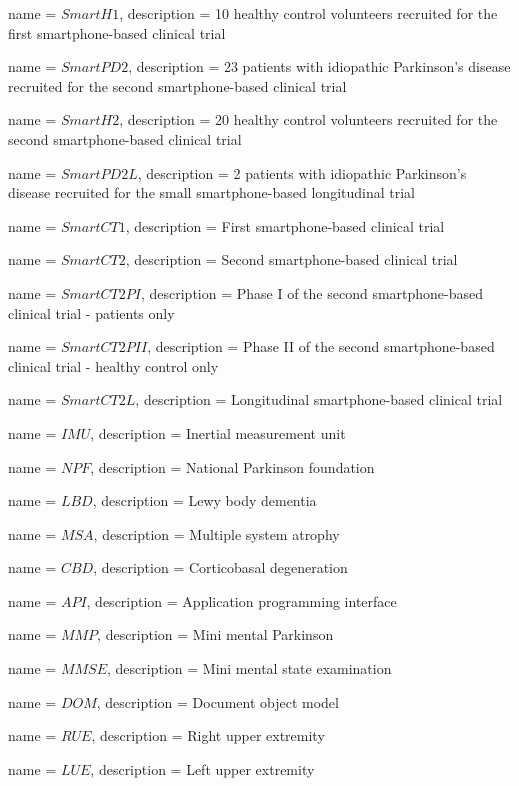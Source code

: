 {
	name = $SmartH1$, 
	description = 10 healthy control volunteers recruited for the first smartphone-based clinical trial
}

{
	name = $SmartPD2$, 
	description = 23 patients with idiopathic Parkinson's disease recruited for the second smartphone-based clinical trial
}

{
	name = $SmartH2$, 
	description = 20 healthy control volunteers recruited for the second smartphone-based clinical trial
}

{
	name = $SmartPD2L$, 
	description = 2 patients with idiopathic Parkinson's disease recruited for the small smartphone-based longitudinal trial
}

{
	name = $SmartCT1$, 
	description = First smartphone-based clinical trial
}

{
	name = $SmartCT2$, 
	description = Second smartphone-based clinical trial
}

{
	name = $SmartCT2PI$, 
	description = Phase I of the second smartphone-based clinical trial - patients only
}

{
	name = $SmartCT2PII$, 
	description = Phase II of the second smartphone-based clinical trial - healthy control only
}

{
	name = $SmartCT2L$, 
	description = Longitudinal smartphone-based clinical trial
}

{
	name = $IMU$, 
	description = Inertial measurement unit
}

{
	name = $NPF$, 
	description = National Parkinson foundation
}

{
	name = $LBD$, 
	description = Lewy body dementia
}

{
	name = $MSA$, 
	description = Multiple system atrophy
}

{
	name = $CBD$, 
	description = Corticobasal degeneration
}

{
	name = $API$, 
	description = Application programming interface
}

{
	name = $MMP$, 
	description = Mini mental Parkinson
}

{
	name = $MMSE$, 
	description = Mini mental state examination
}

{
	name = $DOM$, 
	description = Document object model
}

{
	name = $RUE$, 
	description = Right upper extremity
}

{
	name = $LUE$, 
	description = Left upper extremity
}
\makenoidxglossaries